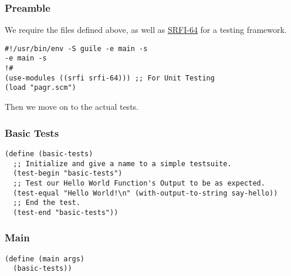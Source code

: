 \documentclass[11pt]{article}
\begin{document}
\subsubsection{Preamble}
\label{sec:org25151aa}
We require the files defined above, as well as \href{https://srfi.schemers.org/srfi-64/srfi-64.html}{SRFI-64} for a testing
framework.

\begin{verbatim}
#!/usr/bin/env -S guile -e main -s
-e main -s
!#
(use-modules ((srfi srfi-64))) ;; For Unit Testing
(load "pagr.scm")
\end{verbatim}

Then we move on to the actual tests.

\subsubsection{Basic Tests}
\label{sec:org4511443}

\begin{verbatim}
(define (basic-tests)
  ;; Initialize and give a name to a simple testsuite.
  (test-begin "basic-tests")
  ;; Test our Hello World Function's Output to be as expected.
  (test-equal "Hello World!\n" (with-output-to-string say-hello))
  ;; End the test.
  (test-end "basic-tests"))
\end{verbatim}

\subsubsection{Main}
\label{sec:org4d30251}

\begin{verbatim}
(define (main args)
  (basic-tests))
\end{verbatim}
\end{document}
